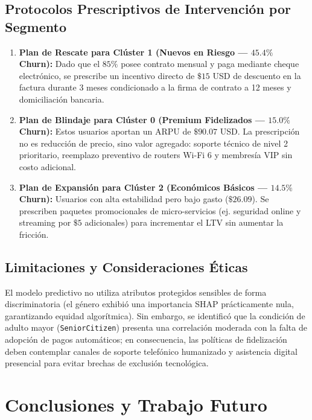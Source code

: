 \documentclass[11pt,letterpaper]{article}
\begin{document}
\subsection{Protocolos Prescriptivos de Intervención por Segmento}
\begin{enumerate}
    \item \textbf{Plan de Rescate para Clúster 1 (Nuevos en Riesgo — $45.4\%$ Churn):} Dado que el $85\%$ posee contrato mensual y paga mediante cheque electrónico, se prescribe un incentivo directo de $\$15$ USD de descuento en la factura durante 3 meses condicionado a la firma de contrato a 12 meses y domiciliación bancaria.
    \item \textbf{Plan de Blindaje para Clúster 0 (Premium Fidelizados — $15.0\%$ Churn):} Estos usuarios aportan un ARPU de $\$90.07$ USD. La prescripción no es reducción de precio, sino valor agregado: soporte técnico de nivel 2 prioritario, reemplazo preventivo de routers Wi-Fi 6 y membresía VIP sin costo adicional.
    \item \textbf{Plan de Expansión para Clúster 2 (Económicos Básicos — $14.5\%$ Churn):} Usuarios con alta estabilidad pero bajo gasto ($\$26.09$). Se prescriben paquetes promocionales de micro-servicios (ej. seguridad online y streaming por $\$5$ adicionales) para incrementar el LTV sin aumentar la fricción.
\end{enumerate}

\subsection{Limitaciones y Consideraciones Éticas}
El modelo predictivo no utiliza atributos protegidos sensibles de forma discriminatoria (el género exhibió una importancia SHAP prácticamente nula, garantizando equidad algorítmica). Sin embargo, se identificó que la condición de adulto mayor (\texttt{SeniorCitizen}) presenta una correlación moderada con la falta de adopción de pagos automáticos; en consecuencia, las políticas de fidelización deben contemplar canales de soporte telefónico humanizado y asistencia digital presencial para evitar brechas de exclusión tecnológica.

\section{Conclusiones y Trabajo Futuro}
\end{document}
